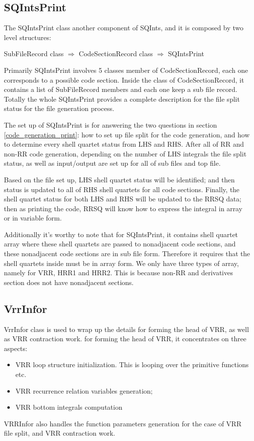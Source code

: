 \subsection{SQIntsPrint}
\label{sqintsprint}

The SQIntsPrint class another component of SQInts, and it is composed by two level structures:
\begin{center}
 SubFileRecord class $\Rightarrow$ CodeSectionRecord class $\Rightarrow$ SQIntsPrint
\end{center}

Primarily SQIntsPrint involves 5 classes member of CodeSectionRecord, each one corresponds to a 
possible code section. Inside the class of CodeSectionRecord, it contains a list of SubFileRecord
members and each one keep a sub file record. Totally the whole SQIntsPrint provides a complete
description for the file split status for the file generation process.

The set up of SQIntsPrint is for answering the two questions in section \ref{code_generation_print}:
how to set up file split for the code generation, and how to determine every shell quartet status 
from LHS and RHS. After all of RR and non-RR code generation, depending on the number of LHS integrals
the file split status, as well as input/output are set up for all of sub files and top file. 

Based on the file set up, LHS shell quartet status will be identified; and then status is updated
to all of RHS shell quartets for all code sections. Finally, the shell quartet status for both
LHS and RHS will be updated to the RRSQ data; then as printing the code, RRSQ will know how to express
the integral in array or in variable form.

Additionally it's worthy to note that for SQIntsPrint, it contains shell quartet array where these 
shell quartets are passed to nonadjacent code sections, and these nonadjacent code sections are in
sub file form. Therefore it requires that the shell quartets inside must be in array form. We only
have three types of array, namely for VRR, HRR1 and HRR2. This is because non-RR and derivatives 
section does not have nonadjacent sections. 

\subsection{VrrInfor}
\label{vrrinfor}

VrrInfor class is used to wrap up the details for forming the head of VRR, as well as VRR contraction
work. for forming the head of VRR, it concentrates on three aspects:
\begin{itemize}
 \item VRR loop structure initialization. This is looping over the primitive functions etc.
 \item VRR recurrence relation variables generation;
 \item VRR bottom integrals computation
\end{itemize}
VRRInfor also handles the function parameters generation for the case of VRR file split, and VRR 
contraction work. 

